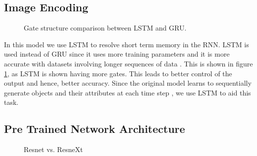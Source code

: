\documentclass[10pt,twocolumn,letterpaper]{article}
\begin{document}
\subsection{Image Encoding}

\begin{figure}[t]
\begin{center}
\end{center}
   \caption{Gate structure comparison between LSTM and GRU.\cite{3}}
\label{lstmvgru}
\end{figure}

In this model we use LSTM to resolve short term memory in the RNN. LSTM is used instead of GRU since it uses more training parameters and it is more accurate with datasets involving longer sequences of data \cite{3}. This is shown in figure \ref{lstmvgru}, as LSTM is shown having more gates. This leads to better control of the output and hence, better accuracy. Since the original model learns to sequentially generate objects and their attributes at each time step \cite{1},  we use LSTM to aid this task.

\subsection{Pre Trained Network Architecture}

\begin{figure}[t]
\begin{center}
\end{center}
   \caption{Resnet vs. ResneXt \cite{1}}
\label{resnext}
\end{figure}
\end{document}

